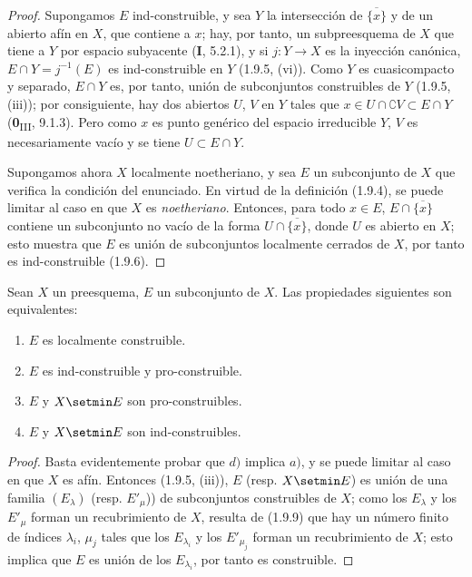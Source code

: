 \begin{proof}
Supongamos $E$ ind-construible, y sea $Y$ la intersección de
$\overline{\{x\}}$ y de un abierto afín en $X$, que contiene a $x$; hay,
por tanto, un subpreesquema de $X$ que tiene a $Y$ por espacio subyacente (\textbf{I}, 5.2.1),
y si $j:Y\to X$ es la inyección canónica,
$E\cap Y=j^{-1}(E)$ es ind-construible en $Y$ (1.9.5, (vi)). Como $Y$
es cuasicompacto y separado, $E\cap Y$ es, por tanto, unión de subconjuntos
construibles de $Y$ (1.9.5, (iii)); por consiguiente, hay dos abiertos $U$,
$V$ en $Y$ tales que
$x\in U\cap\complement V\subset E\cap Y$ (\textbf{0}\textsubscript{III}, 9.1.3).
Pero como $x$ es punto genérico del espacio irreducible $Y$, $V$ es
necesariamente vacío y se tiene $U\subset E\cap Y$.

Supongamos ahora $X$ localmente noetheriano, y sea $E$ un subconjunto de
$X$ que verifica la condición del enunciado. En virtud de la definición (1.9.4),
se puede limitar al caso en que $X$ es \emph{noetheriano}. Entonces, para todo $x\in E$,
$E\cap\overline{\{x\}}$ contiene un subconjunto no vacío de la forma
$U\cap\overline{\{x\}}$, donde $U$ es abierto en $X$; esto muestra que $E$
es unión de subconjuntos localmente cerrados de $X$, por tanto es
ind-construible (1.9.6).
\end{proof}

\begin{proposition}[1.9.11]
\label{IV.1.9.11-fr}
Sean $X$ un preesquema, $E$ un subconjunto de $X$. Las propiedades siguientes son
equivalentes:
\begin{enumerate}
  \item[a)] $E$ es localmente construible.
  \item[b)] $E$ es ind-construible y pro-construible.
  \item[c)] $E$ y $X\setmin E$ son pro-construibles.
  \item[d)] $E$ y $X\setmin E$ son ind-construibles.
\end{enumerate}
\end{proposition}

\begin{proof}
Basta evidentemente probar que $d)$ implica $a)$, y se puede limitar
al caso en que $X$ es afín. Entonces (1.9.5, (iii)), $E$ (resp. $X\setmin E$) es unión
de una familia $(E_\lambda)$ (resp. $E'_\mu$)) de subconjuntos construibles de
$X$; como los $E_\lambda$ y los $E'_\mu$ forman un recubrimiento de $X$,
resulta de (1.9.9) que hay un número finito de índices $\lambda_i$,
$\mu_j$ tales que los $E_{\lambda_i}$ y los $E'_{\mu_j}$ forman un
recubrimiento de $X$; esto implica que $E$ es unión de los
$E_{\lambda_i}$, por tanto es construible.
\end{proof}

